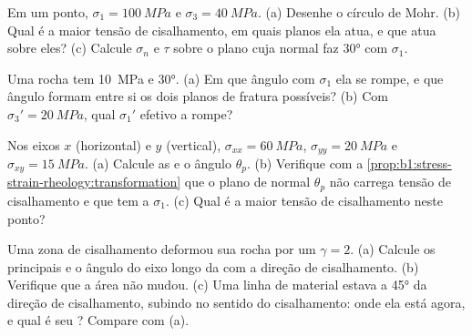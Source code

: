 \begin{exercise}[$\star$]\label{exo:b1:stress-strain-rheology:3}
Em um ponto, $\sigma_1 = \qty{100}{MPa}$ e $\sigma_3 = \qty{40}{MPa}$.
(a) Desenhe o círculo de Mohr. (b) Qual é a maior tensão de cisalhamento, em quais planos ela atua, e que  atua sobre eles? (c) Calcule $\sigma_n$
e $\tau$ sobre o plano cuja normal faz \ang{30} com $\sigma_1$.
\end{exercise}

\begin{exercise}[$\star$]\label{exo:b1:stress-strain-rheology:4}
Uma rocha tem  \qty{10}{MPa} e 
\ang{30}. (a) Em que ângulo com $\sigma_1$ ela se rompe, e que ângulo formam entre si os dois planos de fratura possíveis? (b) Com
$\sigma_3' = \qty{20}{MPa}$, qual $\sigma_1'$ efetivo a rompe?
\end{exercise}

\begin{exercise}[$\star\star$]\label{exo:b1:stress-strain-rheology:5}
Nos eixos $x$ (horizontal) e $y$ (vertical), $\sigma_{xx} = \qty{60}{MPa}$,
$\sigma_{yy} = \qty{20}{MPa}$ e $\sigma_{xy} = \qty{15}{MPa}$. (a) Calcule as
 e o ângulo $\theta_p$. (b) Verifique com a
\cref{prop:b1:stress-strain-rheology:transformation} que o plano de normal
$\theta_p$ não carrega tensão de cisalhamento e que tem a  $\sigma_1$. (c) Qual é a
maior tensão de cisalhamento neste ponto?
\end{exercise}

\begin{exercise}[$\star\star$]\label{exo:b1:stress-strain-rheology:6}
Uma zona de cisalhamento deformou sua rocha por um  $\gamma = 2$. (a) Calcule
os  principais e o ângulo do eixo longo da  com a direção de cisalhamento. (b) Verifique que a área não mudou. (c) Uma linha de material estava a \ang{45} da direção de cisalhamento, subindo no sentido do cisalhamento: onde ela está agora, e qual é seu ? Compare com (a).
\end{exercise}

